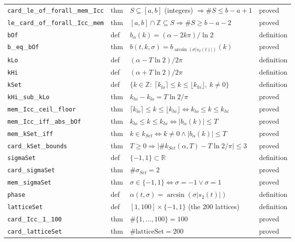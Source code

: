 \documentclass[11pt,a4paper]{article}
\newcommand{\R}{\mathbb{R}}
\newcommand{\Z}{\mathbb{Z}}
\newcommand{\lb}{\_\allowbreak}
\theoremstyle{definition}
\theoremstyle{remark}
\begin{document}
\begin{longtable}{@{}p{3.75cm}p{1.52cm}p{8.38cm}p{1.45cm}@{}}
\texttt{card}\lb\texttt{le}\lb\texttt{of}\lb\texttt{forall}\lb\texttt{mem}\lb\texttt{Icc} & thm & $S\subseteq[a,b]$ (integers) $\Rightarrow \#S\le b-a+1$ & proved\\
\texttt{le}\lb\texttt{card}\lb\texttt{of}\lb\texttt{forall}\lb\texttt{Icc}\lb\texttt{mem} & thm & $[a,b]\cap\Z\subseteq S\Rightarrow \#S\ge b-a-2$ & proved\\
\texttt{bOf} & def & $b_\alpha(k)=(\alpha-2k\pi)/\ln2$ & definition\\
\texttt{b}\lb\texttt{eq}\lb\texttt{bOf} & thm & $b(t,k,\sigma)=b_{\arcsin(\sigma|s_2(t)|)}(k)$ & proved\\
\texttt{kLo} & def & $(\alpha-T\ln2)/2\pi$ & definition\\
\texttt{kHi} & def & $(\alpha+T\ln2)/2\pi$ & definition\\
\texttt{kSet} & def & $\{k\in\Z:\ \lceil k_{lo}\rceil\le k\le\lfloor k_{hi}\rfloor,\ k\neq0\}$ & definition\\
\texttt{kHi}\lb\texttt{sub}\lb\texttt{kLo} & thm & $k_{hi}-k_{lo}=T\ln2/\pi$ & proved\\
\texttt{mem}\lb\texttt{Icc}\lb\texttt{ceil}\lb\texttt{floor} & thm & $\lceil k_{lo}\rceil\le k\le\lfloor k_{hi}\rfloor\iff k_{lo}\le k\le k_{hi}$ & proved\\
\texttt{mem}\lb\texttt{Icc}\lb\texttt{iff}\lb\texttt{abs}\lb\texttt{bOf} & thm & $k_{lo}\le k\le k_{hi}\iff|b_\alpha(k)|\le T$ & proved\\
\texttt{mem}\lb\texttt{kSet}\lb\texttt{iff} & thm & $k\in k_{Set}\iff k\neq0\wedge|b_\alpha(k)|\le T$ & proved\\
\texttt{card}\lb\texttt{kSet}\lb\texttt{bounds} & thm & $T\ge0\Rightarrow\bigl|\#k_{Set}(\alpha,T)-T\ln2/\pi\bigr|\le3$ & proved\\
\texttt{sigmaSet} & def & $\{-1,1\}\subset\R$ & definition\\
\texttt{card}\lb\texttt{sigmaSet} & thm & $\#\sigma_{Set}=2$ & proved\\
\texttt{mem}\lb\texttt{sigmaSet} & thm & $\sigma\in\{-1,1\}\iff\sigma=-1\vee\sigma=1$ & proved\\
\texttt{phase} & def & $\alpha(t,\sigma)=\arcsin(\sigma|s_2(t)|)$ & definition\\
\texttt{latticeSet} & def & $[1,100]\times\{-1,1\}$ (the $200$ lattices) & definition\\
\texttt{card}\lb\texttt{Icc}\lb\texttt{1}\lb\texttt{100} & thm & $\#\{1,\dots,100\}=100$ & proved\\
\texttt{card}\lb\texttt{latticeSet} & thm & $\#\text{latticeSet}=200$ & proved\\

\end{longtable}
\end{document}
